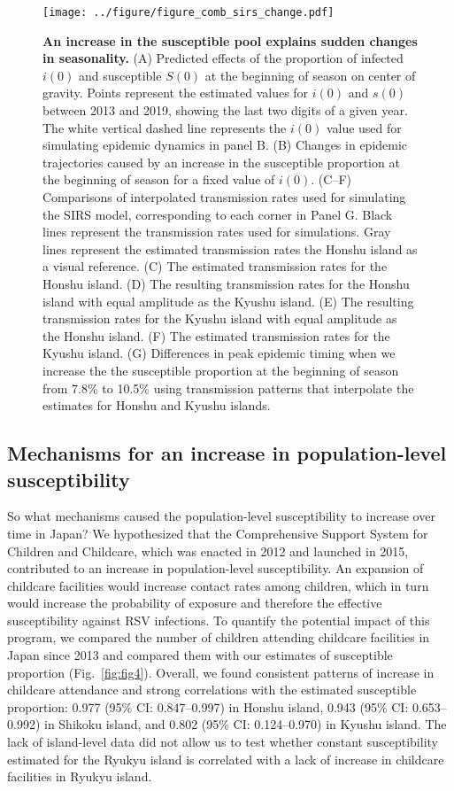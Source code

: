 \documentclass[12pt]{article}
\newcommand{\fref}[1]{Fig.~\ref{fig:#1}}
\begin{document}
\begin{figure}[!th]
\begin{center}
\texttt{[image: ../figure/figure\_comb\_sirs\_change.pdf]}
\caption{
\textbf{An increase in the susceptible pool explains sudden changes in seasonality.}
(A) Predicted effects of the proportion of infected $i(0)$ and susceptible $S(0)$ at the beginning of season on center of gravity.
Points represent the estimated values for $i(0)$ and $s(0)$ between 2013 and 2019, showing the last two digits of a given year.
The white vertical dashed line represents the $i(0)$ value used for simulating epidemic dynamics in panel B.
(B) Changes in epidemic trajectories caused by an increase in the susceptible proportion at the beginning of season for a fixed value of $i(0)$.
(C--F) Comparisons of interpolated transmission rates used for simulating the SIRS model, corresponding to each corner in Panel G. 
Black lines represent the transmission rates used for simulations. 
Gray lines represent the estimated transmission rates the Honshu island as a visual reference.
(C) The estimated transmission rates for the Honshu island.
(D) The resulting transmission rates for the Honshu island with equal amplitude as the Kyushu island.
(E) The resulting transmission rates for the Kyushu island with equal amplitude as the Honshu island.
(F) The estimated transmission rates for the Kyushu island.
(G) Differences in peak epidemic timing when we increase the the susceptible proportion at the beginning of season from 7.8\% to 10.5\% using transmission patterns that interpolate the estimates for Honshu and Kyushu islands. 
}
\label{fig:fig3}
\end{center}
\end{figure}

\subsection*{Mechanisms for an increase in population-level susceptibility}

So what mechanisms caused the population-level susceptibility to increase over time in Japan?
We hypothesized that the Comprehensive Support System for Children and Childcare, which was enacted in 2012 and launched in 2015, contributed to an increase in population-level susceptibility.
An expansion of childcare facilities would increase contact rates among children, which in turn would increase the probability of exposure and therefore the effective susceptibility against RSV infections.
To quantify the potential impact of this program, we compared the number of children attending childcare facilities in Japan since 2013 and compared them with our estimates of susceptible proportion (\fref{fig4}).
Overall, we found consistent patterns of increase in childcare attendance and strong correlations with the estimated susceptible proportion: 0.977 (95\% CI: 0.847--0.997) in Honshu island, 0.943 (95\% CI: 0.653--0.992) in Shikoku island, and 0.802 (95\% CI: 0.124--0.970) in Kyushu island.
The lack of island-level data did not allow us to test whether constant susceptibility estimated for the Ryukyu island is correlated with a lack of increase in childcare facilities in Ryukyu island.
\end{document}
